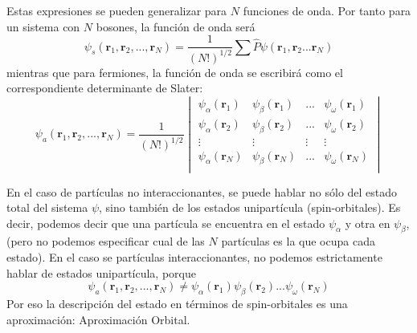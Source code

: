 Estas expresiones se pueden generalizar para $N$ funciones de onda.
Por tanto para un sistema con $N$ bosones, la función de onda 
será
\begin{equation}
    \psi_s(\mathbf{r}_1,\mathbf{r}_2, ..., \mathbf{r}_N) = \frac{1}{(N!)^{1/2}}
    \sum\hat{P}\psi(\mathbf{r}_1,\mathbf{r}_2 ... \mathbf{r}_N) 
\end{equation}
mientras que para fermiones, la función de onda se escribirá como
el correspondiente determinante de Slater:
\begin{equation}
    \psi_a(\mathbf{r}_1,\mathbf{r}_2, ..., \mathbf{r}_N) = \frac{1}{(N!)^{1/2}}
    \begin{vmatrix} 
    \psi_\alpha(\mathbf{r}_1) & \psi_\beta(\mathbf{r}_1) & ... & \psi_\omega(\mathbf{r}_1)  \\
    \psi_\alpha(\mathbf{r}_2) & \psi_\beta(\mathbf{r}_2) & ... & \psi_\omega(\mathbf{r}_2)  \\
    \vdots & \vdots & \vdots& \vdots\\
    \psi_\alpha(\mathbf{r}_N) & \psi_\beta(\mathbf{r}_N) & ... & \psi_\omega(\mathbf{r}_N)  \\
    \end{vmatrix}
\end{equation}

En el caso de partículas no interaccionantes, se puede hablar no sólo del
estado total del sistema $\psi$, sino también de los estados unipartícula
(spin-orbitales). Es decir, podemos decir que una partícula se encuentra 
en el estado $\psi_\alpha$ y otra en $\psi_\beta$, (pero no podemos 
especificar cual de las $N$ partículas es la que ocupa cada estado).
En el caso se partículas interaccionantes, no podemos estrictamente hablar
de estados unipartícula, porque
\begin{equation}
    \psi_a(\mathbf{r}_1,\mathbf{r}_2, ..., \mathbf{r}_N) \neq \psi_\alpha(\mathbf{r}_1)\psi_\beta(\mathbf{r}_2)...\psi_\omega(\mathbf{r}_N)
\end{equation}
 Por eso la descripción del estado en términos de spin-orbitales es una aproximación: Aproximación Orbital.
 
